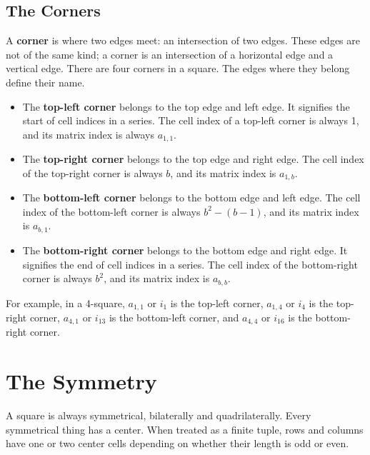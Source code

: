 \documentclass[letterpaper, twoside,12pt]{book}
\begin{document}
    \section{The Corners} \label{corners}
    A \textbf{corner} is where two edges meet: an intersection of two edges. These edges are not of the same kind; a corner is an intersection of a horizontal edge and a vertical edge. There are four corners in a square. The edges where they belong define their name.
    \begin{itemize}
        \item The \textbf{top-left corner} belongs to the top edge and left edge. It signifies the start of cell indices in a series. The cell index of a top-left corner is always 1, and its matrix index is always $a_{1,1}$.
        \item The \textbf{top-right corner} belongs to the top edge and right edge. The cell index of the top-right corner is always $b$, and its matrix index is $a_{1,b}$.
        \item The \textbf{bottom-left corner} belongs to the bottom edge and left edge. The cell index of the bottom-left corner is always $b^2 - (b - 1)$, and its matrix index is $a_{b,1}$.
        \item The \textbf{bottom-right corner} belongs to the bottom edge and right edge. It signifies the end of cell indices in a series. The cell index of the bottom-right corner is always $b^2$, and its matrix index is $a_{b,b}$.
    \end{itemize}

    For example, in a 4-square, $a_{1,1}$ or $i_1$ is the top-left corner, $a_{1,4}$ or $i_4$ is the top-right corner, $a_{4,1}$ or $i_{13}$ is the bottom-left corner, and $a_{4,4}$ or $i_{16}$ is the bottom-right corner.

    \newpage

    \chapter{The Symmetry} \label{symmetry}
    A square is always symmetrical, bilaterally and quadrilaterally. Every symmetrical thing has a center. When treated as a finite tuple, rows and columns have one or two center cells depending on whether their length is odd or even.
\end{document}

